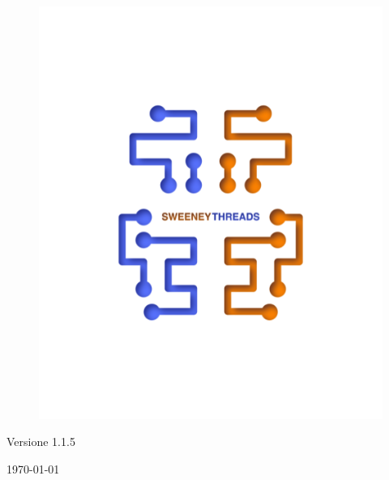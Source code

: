 \documentclass[a4paper]{article}
\begin{document}
\begin{titlepage}
		\begin{figure}[H]
			\centering
			\includegraphics[scale=0.8]{sweeney.png}
		\end{figure}
		\begin{center}
			Versione 1.1.5
		\end{center}
		{\large \today}\\[3cm] 
		\vfill  
	\end{titlepage}
	
	\tableofcontents
	
	\newpage 
\end{document}
